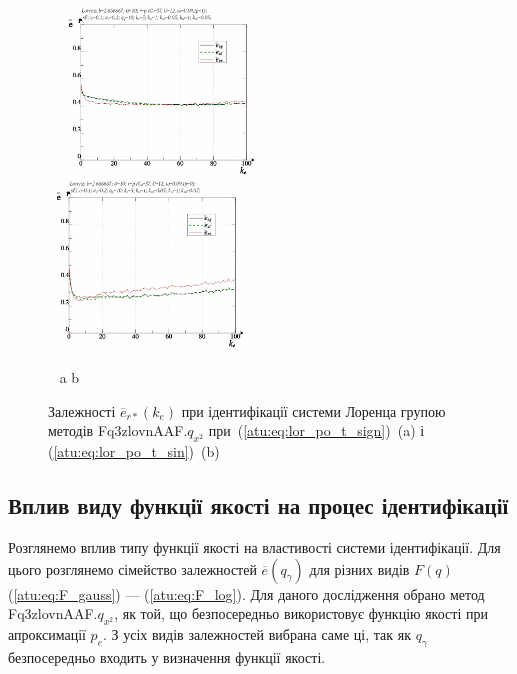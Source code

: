 \begin{figure}[ht!]
  \begin{center}
    ~ \hfill
    \includegraphics[width=0.49\textwidth]{p/cha/lor/Fq3zlovnAAF/lor_Fq3zlovnAAF_qx2-p_ke_e_sign.png}
    \hfill
    \includegraphics[width=0.49\textwidth]{p/cha/lor/Fq3zlovnAAF/lor_Fq3zlovnAAF_qx2-p_ke_e_sin.png}
    \hfill ~
  \end{center}
  \vspace{-1.0ex}
  \begin{center}
    ~ \hfill a \hfill\hfill b \hfill ~
  \end{center}
  \vspace{-1.5ex}
  \caption{Залежності $ \overline{e}_{r *} (k_e) $ при ідентифікації системи Лоренца групою методів Fq3zlovnAAF.$q_{x^2} $ при~(\ref{atu:eq:lor_po_t_sign})~(a) і (\ref{atu:eq:lor_po_t_sin})~(b)}
\label{atu:f:lor_ke_Fq3zlovnAAF.q_x2}
\end{figure}





\subsection{Вплив виду функції якості на процес ідентифікації}%

Розглянемо вплив типу функції якості на властивості системи
ідентифікації. Для цього розглянемо сімейство залежностей
$ \overline{e} (q_\gamma) $ для різних видів
$ F (q) $ (\ref{atu:eq:F_gauss}) --- (\ref{atu:eq:F_log}). Для даного дослідження обрано
метод Fq3zlovnAAF.$q_{x^2} $, як той, що безпосередньо використовує функцію якості при
апроксимації $ p_e $. З усіх видів залежностей вибрана саме ці, так як
$ q_\gamma $ безпосередньо входить у визначення функції якості.


